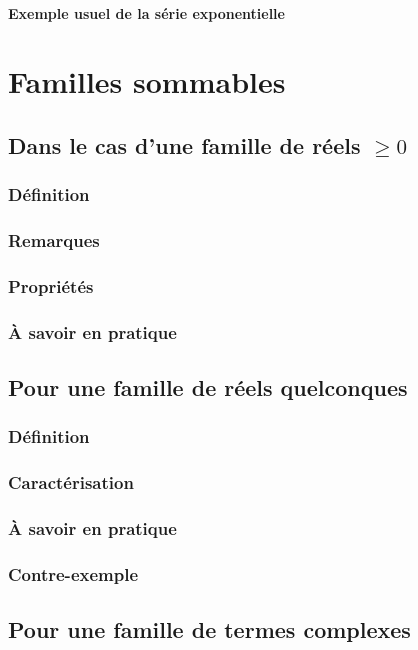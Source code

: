 \documentclass[12pt,a4paper,french]{book}
\begin{document}
			\subsubsection{Exemple usuel de la série exponentielle}

\chapter{Familles sommables}
	\section{Dans le cas d'une famille de réels $\geqslant 0$}
		\subsection{Définition}
		\subsection{Remarques}
		\subsection{Propriétés}
		\subsection{À savoir en pratique}
	\section{Pour une famille de réels quelconques}
		\subsection{Définition}
		\subsection{Caractérisation}
		\subsection{À savoir en pratique}
		\subsection{Contre-exemple}
	\section{Pour une famille de termes complexes}
\end{document}
